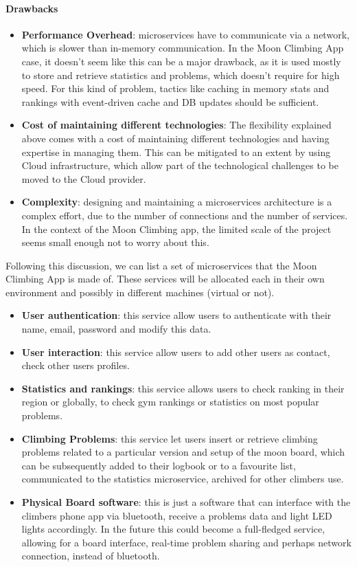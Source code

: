 \documentclass{article}
\begin{document}
\paragraph*{Drawbacks}
\begin{itemize}
    \item \textbf{Performance Overhead}: microservices have to communicate via a network, which is slower than in-memory communication. In the Moon Climbing App case, it doesn't seem like this can be a major drawback, as it is used mostly to store and retrieve statistics and problems, which doesn't require for high speed. For this kind of problem, tactics like caching in memory stats and rankings with event-driven cache and DB updates should be sufficient. 
    \item \textbf{Cost of maintaining different technologies}: The flexibility explained above comes with a cost of maintaining different technologies and having expertise in managing them. This can be mitigated to an extent by using Cloud infrastructure, which allow part of the technological challenges to be moved to the Cloud provider.
    \item \textbf{Complexity}: designing and maintaining a microservices architecture is a complex effort, due to the number of connections and the number of services. In the context of the Moon Climbing app, the limited scale of the project seems small enough not to worry about this.
\end{itemize}

Following this discussion, we can list a set of microservices that the Moon Climbing App is made of. 
These services will be allocated each in their own environment and possibly in different machines (virtual or not).

\begin{itemize}
    \item \textbf{User authentication}: this service allow users to authenticate with their name, email, password and modify this data.
    \item \textbf{User interaction}: this service allow users to add other users as contact, check other users profiles.
    \item \textbf{Statistics and rankings}: this service allows users to check ranking in their region or globally, to check gym rankings or statistics on most popular problems.
    \item \textbf{Climbing Problems}: this service let users insert or retrieve climbing problems related to a particular version and setup of the moon board, which can be subsequently added to their logbook or to a favourite list, communicated to the statistics microservice, archived for other climbers use.
    \item \textbf{Physical Board software}: this is just a software that can interface with the climbers phone app via bluetooth, receive a problems data and light LED lights accordingly. In the future this could become a full-fledged service, allowing for a board interface, real-time problem sharing and perhaps network connection, instead of bluetooth.
\end{itemize}
\end{document}
